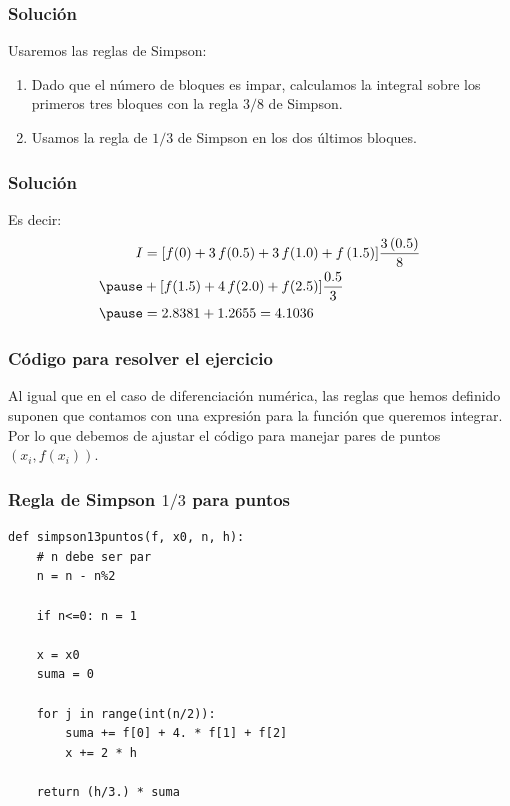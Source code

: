 \documentclass[12pt]{beamer}
\begin{document}
\begin{frame}
\frametitle{Solución}
Usaremos las reglas de Simpson:
\pause
{}
\begin{enumerate}[<+->]
\item Dado que el número de bloques es impar, calculamos la integral sobre los primeros tres bloques con la regla $3/8$ de Simpson.
\item Usamos la regla de $1/3$ de Simpson en los dos últimos bloques.
\end{enumerate}
\end{frame}
\begin{frame}
\frametitle{Solución}
Es decir:
\pause
\begin{eqnarray*}
\begin{aligned}
I &= [f (0) + 3 \, f (0.5) + 3 \, f(1.0) + f \, (1.5)]\dfrac{3 \, (0.5)}{8} \\ \pause
&+ [ f (1.5) + 4 \, f (2.0) + f (2.5)] \dfrac{0.5}{3} \\ \pause
&= 2.8381 + 1.2655 = 4.1036
\end{aligned}
\end{eqnarray*}
\end{frame}
\begin{frame}
\frametitle{Código para resolver el ejercicio}
Al igual que en el caso de diferenciación numérica, las reglas que hemos definido suponen que contamos con una expresión para la función que queremos integrar.
\\
\bigskip
\pause
Por lo que debemos de ajustar el código para manejar pares de puntos $(x_{i}, f (x_{i}))$.
\end{frame}
\begin{frame}
\frametitle{Regla de Simpson $1/3$ para puntos}
\begin{lstlisting}[caption=Regla de Simpson 1/3 para obtener la integral con pares de puntos]
def simpson13puntos(f, x0, n, h):
	# n debe ser par
	n = n - n%2

	if n<=0: n = 1

	x = x0
	suma = 0

	for j in range(int(n/2)):
		suma += f[0] + 4. * f[1] + f[2]
		x += 2 * h

	return (h/3.) * suma
\end{lstlisting}
\end{frame}
\end{document}
